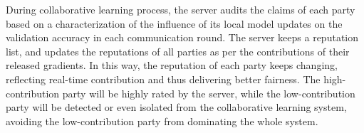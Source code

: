 \documentclass{article}
\begin{document}
%
%
%
%
%
%


During collaborative learning process, the server audits the claims of each party based on a characterization of the influence of its local model updates %
on the validation accuracy in each communication round. 
The server keeps a reputation list, and updates the reputations of all parties as per the contributions of their released gradients. In this way, the reputation of each party keeps changing, reflecting real-time contribution and thus delivering better fairness. The high-contribution party will be highly rated by the server, while the low-contribution party will be detected or even isolated from the collaborative learning system, avoiding the low-contribution party from dominating the whole system.
\end{document}

